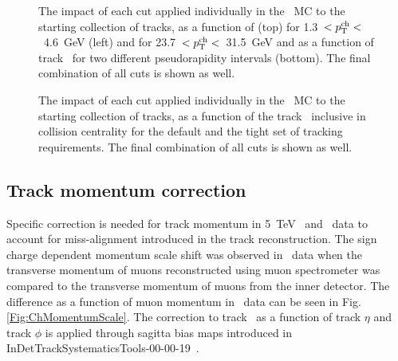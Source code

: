 \begin{figure}
{\begin{tabular}{cc}
\end{tabular} }
\caption{The impact of each cut applied individually in the \pp\ MC 
to the starting collection of tracks, as a function of
\etatrk (top) for 1.3~$< \mbox{$p_{\mathrm{T}}^{\mathrm{ch}}$}<$~4.6~GeV (left) and for 23.7~$<\mbox{$p_{\mathrm{T}}^{\mathrm{ch}}$}<$~31.5~GeV and as a function of track \pT\ for two different pseudorapidity intervals (bottom).
 The final combination of all cuts is shown as well.}
\label{fig:ppcutflow_eta}
\end{figure}

\begin{figure}
\caption{The impact of each cut applied individually in the \PbPb\ MC 
to the starting collection of tracks, as a function of the track \pT\ inclusive in collision centrality for the default and the tight set of tracking requirements.
The final combination of all cuts
is shown as well.}
\label{fig:PbPbcutflow_eta}
\end{figure}




\subsection{Track momentum correction}
\label{Sec:Trackmomentumcorrection}
Specific correction is needed for track momentum in 5~TeV \pp\ and \PbPb\ data to account for miss-alignment introduced in the track reconstruction.
The sign charge dependent momentum scale shift was observed in \pp\ data when the transverse momentum of muons reconstructed using muon spectrometer was compared to the transverse momentum of muons from the inner detector.
The difference as a function of muon momentum in \pbpb\ data can be seen in Fig.\ref{Fig:ChMomentumScale}.
The correction to track \pt\ as a function of track $\eta$ and track $\phi$ is applied through sagitta bias maps introduced in InDetTrackSystematicsTools-00-00-19~\cite{TrackingRec}.

